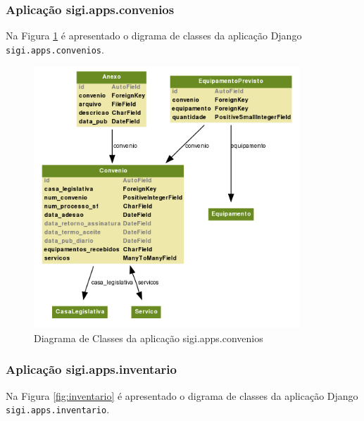 \subsubsection{Aplicação sigi.apps.convenios}
Na Figura \ref{fig:convenios} é apresentado o digrama de classes da
aplicação Django \verb|sigi.apps.convenios|.

\begin{figure}[h]
  \centering
  \includegraphics[width=100mm]{../imagens/convenios.png}
  \caption{Diagrama de Classes da aplicação sigi.apps.convenios}
  \label{fig:convenios}
\end{figure}

\subsubsection{Aplicação sigi.apps.inventario}
Na Figura \ref{fig:inventario} é apresentado o digrama de classes da
aplicação Django \verb|sigi.apps.inventario|.

